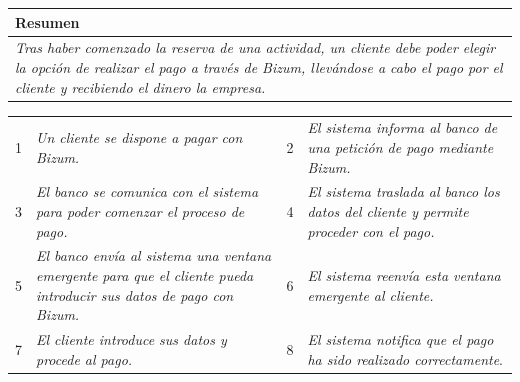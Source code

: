     \begin{table}[H]
        \begin{tabular}{llllllll}
    \hline
    \multicolumn{8}{|l|}{\cellcolor[HTML]{F2F2F2}Resumen}                                                                                                                                                                                                                                                                                                                                                                                             \\ \hline
    \multicolumn{8}{|p{15cm}|}{{\color[HTML]{808080} \textit{Tras haber comenzado la reserva de una actividad, un cliente debe poder elegir la opción de realizar el pago a través de Bizum, llevándose a cabo el pago por el cliente y recibiendo el dinero la empresa.}}} \\ \hline
    \end{tabular}
    \end{table}
    \begin{table}[h!]
        \centering
        \begin{tabular}{|p{0.6cm}|p{6.5cm}|p{0.6cm}|p{6.5cm}|}
        \rowcolor{lightgray}
        \hline
        \multicolumn{4}{|l|}{Curso Normal (Básico)} \\
        \hline
        1 & \color[HTML]{808080}\textit{Un cliente se dispone a pagar con Bizum.} & 2 & \color[HTML]{808080}\textit{El sistema informa al banco de una petición de pago mediante Bizum.} \\
        \hline
        3 & \color[HTML]{808080}\textit{El banco se comunica con el sistema para poder comenzar el proceso de pago.} & 4 & \color[HTML]{808080}\textit{El sistema traslada al banco los datos del cliente y permite proceder con el pago.} \\
        \hline
        5 & \color[HTML]{808080}\textit{El banco envía al sistema una ventana emergente para que el cliente pueda introducir sus datos de pago con Bizum.} & 6 & \color[HTML]{808080}\textit{El sistema reenvía esta ventana emergente al cliente.} \\
        \hline
        7 & \color[HTML]{808080}\textit{El cliente introduce sus datos y procede al pago.} & 8 & \color[HTML]{808080}\textit{El sistema notifica que el pago ha sido realizado correctamente}. \\
        \hline
        \end{tabular}
        \end{table}
        

